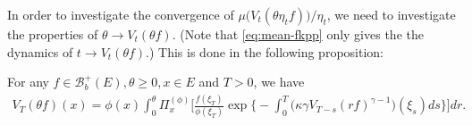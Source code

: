 	In order to investigate the convergence of $\mu\big( V_t(\theta \eta_t f) \big)/ \eta_t$, we need to investigate the properties of $\theta\to V_t(\theta f)$.
	(Note that \eqref{eq:mean-fkpp} only gives the the dynamics of $t\to V_t(\theta f)$.)
	This is done in the following proposition:

\begin{prop}
	For any $f\in \mathscr B^+_b(E),\theta \geq 0,x\in E$ and $T>0$, we have
\begin{align}\label{eq: equation for Vt(theta f) for theta}
	V_T ( \theta f) ( x)
	= \phi( x) \int_0^\theta \Pi_x^{(\phi)} \Big[ \frac{ f(\xi_T) } { \phi(\xi_T) } \exp\Big\{ - \int_0^T \big( \kappa \gamma V_{T-s} (r f)^{ \gamma - 1} \big) ( \xi_s) ds\Big\} \Big] dr.
\end{align}
\end{prop}

